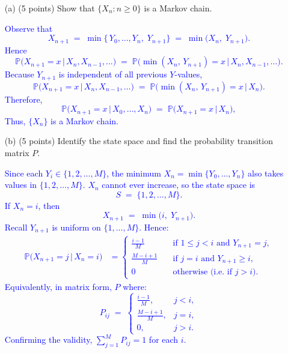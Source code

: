 \documentclass{article}
\begin{document}
\begin{enumerate}
    \item[(a)] (5 points) Show that $\{X_n : n \geq 0\}$ is a Markov chain.

    \textcolor{blue}{Observe that
\[
  X_{n+1} 
  \;=\; \min\{\,Y_0,\ldots,Y_n,\;Y_{n+1}\}
  \;=\; \min\bigl(X_n,\;Y_{n+1}\bigr).
\]
Hence
\[
  \mathbb{P}\bigl(X_{n+1}=x \,\big\vert\, X_n, X_{n-1},\dots\bigr)
  \;=\; \mathbb{P}\bigl(\min(X_n,\,Y_{n+1}) = x \,\big\vert\, X_n, X_{n-1},\dots\bigr).
\]
Because \(Y_{n+1}\) is independent of all previous \(Y\)-values, 
\[
  \mathbb{P}\bigl(X_{n+1}=x \,\big\vert\, X_n, X_{n-1},\dots\bigr)
  \;=\; \mathbb{P}\bigl(\min(X_n,\,Y_{n+1})=x \,\big\vert\, X_n\bigr).
\]
Therefore,
\[
  \mathbb{P}\bigl(X_{n+1} = x \,\big\vert\, X_0,\ldots,X_n\bigr)
  \;=\;
  \mathbb{P}\bigl(X_{n+1} = x \,\big\vert\, X_n\bigr),
\]
Thus, \(\{X_n\}\) is a Markov chain.
}

    \item[(b)] (5 points) Identify the state space and find the probability transition matrix $P$.

    \textcolor{blue}{Since each \(Y_i \in \{1,2,\dots,M\}\), the minimum \(X_n = \min\{Y_0,\dots,Y_n\}\) also takes values in \(\{1,2,\dots,M\}\). \(X_n\) cannot ever increase, so the state space is
\[
  S \;=\; \{1,2,\dots,M\}.
\]
If \(X_n = i\), then
\[
  X_{n+1} \;=\; \min\bigl(i,\;Y_{n+1}\bigr).
\]
Recall \(Y_{n+1}\) is uniform on \(\{1,\dots,M\}\).  Hence:
\[
  \begin{aligned}
  \mathbb{P}\bigl(X_{n+1}=j \,\big\vert\, X_n=i\bigr)
  &=
  \begin{cases}
     \displaystyle
     \frac{i-1}{M}
     &\quad\text{if } 1 \le j < i
       \text{ and } Y_{n+1} = j,\\[1em]
     \displaystyle
     \frac{M - i+1}{M}
     &\quad\text{if } j = i
       \text{ and } Y_{n+1} \ge i,\\[0.75em]
     0
     &\quad\text{otherwise (i.e.\ if } j>i).
  \end{cases}
  \end{aligned}
\]
Equivalently, in matrix form, $P$ where:
\[
  P_{ij}
  \;=\;
  \begin{cases}
     \tfrac{i-1}{M}, & j < i,\\[6pt]
     \tfrac{M-i+1}{M}, & j = i,\\[6pt]
     0, & j> i.
  \end{cases}
\]
Confirming the validity, \(\sum_{j=1}^M P_{ij} = 1\) for each \(i\).
}


\end{enumerate}
\end{document}

